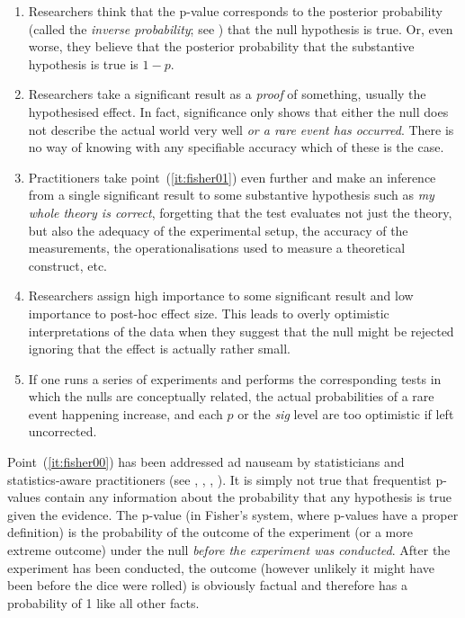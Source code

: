 \begin{enumerate}
  \item \label{it:fisher00} Researchers think that the p-value corresponds to the posterior probability (called the \textit{inverse probability}; see \citealt{Senn2011}) that the null hypothesis is true.
  Or, even worse, they believe that the posterior probability that the substantive hypothesis is true is $1-p$.
  \item \label{it:fisher01} Researchers take a significant result as a \textit{proof} of something, usually the hypothesised effect.
  In fact, significance only shows that either the null does not describe the actual world very well \textit{or a rare event has occurred}.
  There is no way of knowing with any specifiable accuracy which of these is the case.
\item \label{it:fisher02} Practitioners take point~(\ref{it:fisher01}) even further and make an inference from a single significant result to some substantive hypothesis such as \textit{my whole theory is correct}, forgetting that the test evaluates not just the theory, but also the adequacy of the experimental setup, the accuracy of the measurements, the operationalisations used to measure a theoretical construct, etc.
  \item \label{it:fisher03} Researchers assign high importance to some significant result and low importance to post-hoc effect size.
    This leads to overly optimistic interpretations of the data when they suggest that the null might be rejected ignoring that the effect is actually rather small.
  \item \label{it:fisher04} If one runs a series of experiments and performs the corresponding tests in which the nulls are conceptually related, the actual probabilities of a rare event happening increase, and each $p$ or the \textit{sig} level are too optimistic if left uncorrected.
\end{enumerate}

\vspace{\baselineskip}

Point~(\ref{it:fisher00}) has been addressed ad nauseam by statisticians and statistics-aware practitioners (see \citealt{Goodman2008}, \citealt{Perezgonzalez2014}, \citealt{Perezgonzalez2015}, \citealt{GreenlandEa2016}).
It is simply not true that frequentist p-values contain any information about the probability that any hypothesis is true given the evidence.
The p-value (in Fisher's system, where p-values have a proper definition) is the probability of the outcome of the experiment (or a more extreme outcome) under the null \textit{before the experiment was conducted}.
After the experiment has been conducted, the outcome (however unlikely it might have been before the dice were rolled) is obviously factual and therefore has a probability of 1 like all other facts.


